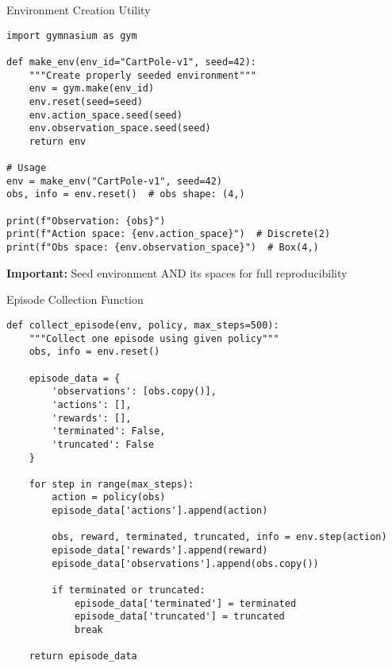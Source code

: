 \documentclass[aspectratio=169,10pt]{beamer}
\begin{document}
\begin{frame}[fragile]{Environment Creation Utility}

\begin{lstlisting}
import gymnasium as gym

def make_env(env_id="CartPole-v1", seed=42):
    """Create properly seeded environment"""
    env = gym.make(env_id)
    env.reset(seed=seed)
    env.action_space.seed(seed)
    env.observation_space.seed(seed)
    return env

# Usage
env = make_env("CartPole-v1", seed=42)
obs, info = env.reset()  # obs shape: (4,)

print(f"Observation: {obs}")
print(f"Action space: {env.action_space}")  # Discrete(2)
print(f"Obs space: {env.observation_space}")  # Box(4,)
\end{lstlisting}

\vfill

\textbf{Important:} Seed environment AND its spaces for full reproducibility

\end{frame}

\begin{frame}[fragile,shrink=6]{Episode Collection Function}

\begin{lstlisting}
def collect_episode(env, policy, max_steps=500):
    """Collect one episode using given policy"""
    obs, info = env.reset()
    
    episode_data = {
        'observations': [obs.copy()],
        'actions': [],
        'rewards': [],
        'terminated': False,
        'truncated': False
    }
    
    for step in range(max_steps):
        action = policy(obs)
        episode_data['actions'].append(action)
        
        obs, reward, terminated, truncated, info = env.step(action)
        episode_data['rewards'].append(reward)
        episode_data['observations'].append(obs.copy())
        
        if terminated or truncated:
            episode_data['terminated'] = terminated
            episode_data['truncated'] = truncated
            break
    
    return episode_data
\end{lstlisting}

\end{frame}
\end{document}

